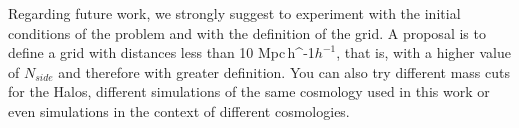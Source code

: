 \documentclass[usenatbib]{mnras}
\newcommand{\Mpch}{\,{\rm Mpc}\,\ifmmode h^{-1}\else $h^{-1}$\fi}
\begin{document}
Regarding future work, we strongly suggest to experiment with the initial conditions of the problem and with the definition of the grid. A proposal is to define a grid with distances less than 10\,\Mpch, that is, with a higher value of $N_{side}$ and therefore with greater definition. You can also try different mass cuts for the Halos, different simulations of the same cosmology used in this work or even simulations in the context of different cosmologies.\\





\end{document}
